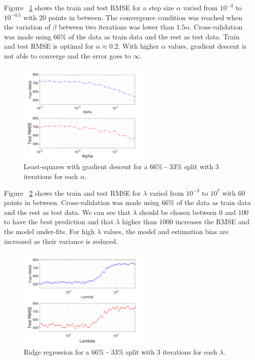 \documentclass{article} %
\begin{document}
Figure ~\ref{fig:reg_alphaRMSE} shows the train and test RMSE for a step size $\alpha$ varied from $10^{-3}$ to $10^{-0.5}$ with $20$ points in between. The convergence condition was reached when the variation of $\beta$ between two iterations was lower than $1.5 \alpha$. Cross-validation was made using $66 \% $ of the data as train data and the rest as test data. Train and test RMSE is optimal for $\alpha \approx 0.2$. With higher $\alpha$ values, gradient descent is not able to converge and the error goes to $\infty$.

\begin{figure}[!h] %
	\center
	\includegraphics[width=2.6in]{figures/alphaRMSE.png}
	\caption{Least-squares with gradient descent for a $66 \%$ - $33 \%$ split with 3 iterations for each $\alpha$.}
	\label{fig:reg_alphaRMSE}
\end{figure}

Figure ~\ref{fig:reg_lambdaRMSE} shows the train and test RMSE for $\lambda$ varied from $10^{-3}$ to $10^{7}$ with $60$ points in between. Cross-validation was made using $66 \% $ of the data as train data and the rest as test data. We can see that $\lambda$ should be chosen between $0$ and $100$ to have the best prediction and that $\lambda$ higher than $1000$ increases the RMSE and the model under-fits. For high $\lambda$ values, the model and estimation bias are increased as their variance is reduced.

\begin{figure}[!h] %
	\center
	\includegraphics[width=2.6in]{figures/lambdaRMSE.png}
	\caption{Ridge regression for a $66 \%$ - $33 \%$ split with 3 iterations for each $\lambda$.}
	\label{fig:reg_lambdaRMSE}
\end{figure}
\end{document}
